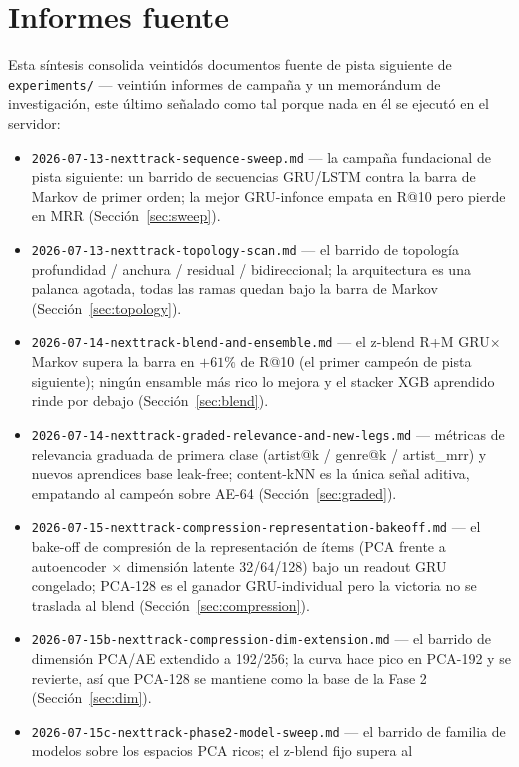 \documentclass[11pt]{article}
\begin{document}
\section{Informes fuente}
Esta síntesis consolida veintidós documentos fuente de pista siguiente de
\texttt{experiments/} --- veintiún informes de campaña y un memorándum de
investigación, este último señalado como tal porque nada en él se ejecutó en el
servidor:
\begin{itemize}
  \item \texttt{2026-07-13-nexttrack-sequence-sweep.md} --- la campaña
    fundacional de pista siguiente: un barrido de secuencias GRU/LSTM contra la
    barra de Markov de primer orden; la mejor GRU-infonce empata en R@10 pero
    pierde en MRR (Sección~\ref{sec:sweep}).
  \item \texttt{2026-07-13-nexttrack-topology-scan.md} --- el barrido de
    topología profundidad / anchura / residual / bidireccional; la arquitectura
    es una palanca agotada, todas las ramas quedan bajo la barra de Markov
    (Sección~\ref{sec:topology}).
  \item \texttt{2026-07-14-nexttrack-blend-and-ensemble.md} --- el z-blend R+M
    GRU$\times$Markov supera la barra en $+61\%$ de R@10 (el primer campeón de
    pista siguiente); ningún ensamble más rico lo mejora y el stacker XGB
    aprendido rinde por debajo (Sección~\ref{sec:blend}).
  \item \texttt{2026-07-14-nexttrack-graded-relevance-and-new-legs.md} ---
    métricas de relevancia graduada de primera clase (artist@k / genre@k /
    artist\_mrr) y nuevos aprendices base leak-free; content-kNN es la única
    señal aditiva, empatando al campeón sobre AE-64 (Sección~\ref{sec:graded}).
  \item \texttt{2026-07-15-nexttrack-compression-representation-bakeoff.md} ---
    el bake-off de compresión de la representación de ítems (PCA frente a
    autoencoder $\times$ dimensión latente 32/64/128) bajo un readout GRU
    congelado; PCA-128 es el ganador GRU-individual pero la victoria no se
    traslada al blend (Sección~\ref{sec:compression}).
  \item \texttt{2026-07-15b-nexttrack-compression-dim-extension.md} --- el
    barrido de dimensión PCA/AE extendido a 192/256; la curva hace pico en
    PCA-192 y se revierte, así que PCA-128 se mantiene como la base de la Fase 2
    (Sección~\ref{sec:dim}).
  \item \texttt{2026-07-15c-nexttrack-phase2-model-sweep.md} --- el barrido de
    familia de modelos sobre los espacios PCA ricos; el z-blend fijo supera al

\end{itemize}
\end{document}
